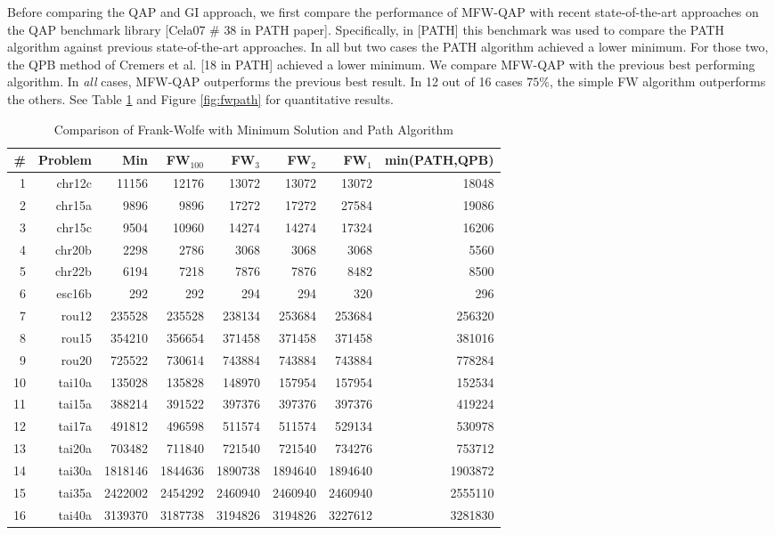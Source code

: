 Before comparing the QAP and GI approach, we first compare the performance of MFW-QAP with recent state-of-the-art approaches on the QAP benchmark library [Cela07 \# 38 in PATH paper].  Specifically, in [PATH] this benchmark was used to compare the PATH algorithm against previous state-of-the-art approaches.  In all but two cases the PATH algorithm achieved a lower minimum.  For those two, the QPB method of Cremers et al. [18 in PATH] achieved a lower minimum.  We compare MFW-QAP with the previous best performing algorithm.  In \emph{all} cases, MFW-QAP outperforms the previous best result.  In 12 out of 16 cases $75\%$, the simple FW algorithm outperforms the others.  See Table \ref{tab:fwpath} and Figure \ref{fig:fwpath} for quantitative results.


\begin{table}[h!]
\caption{Comparison of Frank-Wolfe with Minimum Solution and Path Algorithm}
\begin{center}
\begin{tabular}{|r|r|r||r|r|r|r|r|}
\hline
\# & Problem  &   Min    & FW$_{100}$&FW$_{3}$&FW$_{2}$&FW$_{1}$& min(PATH,QPB)\\
\hline
1&    chr12c &   11156 &   12176 &   13072 &   13072 &   13072 &   18048\\
2&    chr15a &    9896 &    9896 &   17272 &   17272 &   27584 &   19086\\
3&    chr15c &    9504 &   10960 &   14274 &   14274 &   17324 &   16206\\
4&   chr20b &    2298 &    2786 &    3068 &    3068 &    3068 &    5560\\
5&    chr22b &    6194 &    7218 &    7876 &    7876 &    8482 &    8500\\
6&    esc16b &     292 &     292 &     294 &     294 &     320 &     296\\
7&     rou12 &  235528 &  235528 &  238134 &  253684 &  253684 &  256320\\
8&     rou15 &  354210 &  356654 &  371458 &  371458 &  371458 &  381016\\
9&     rou20 &  725522 &  730614 &  743884 &  743884 &  743884 &  778284\\
10&    tai10a &  135028 &  135828 &  148970 &  157954 &  157954 &  152534\\
11&    tai15a &  388214 &  391522 &  397376 &  397376 &  397376 &  419224\\
12&    tai17a &  491812 &  496598 &  511574 &  511574 &  529134 &  530978\\
13&    tai20a &  703482 &  711840 &  721540 &  721540 &  734276 &  753712\\
14&    tai30a & 1818146 & 1844636 & 1890738 & 1894640 & 1894640 & 1903872\\
15&    tai35a & 2422002 & 2454292 & 2460940 & 2460940 & 2460940 & 2555110\\
16&    tai40a & 3139370 & 3187738 & 3194826 & 3194826 & 3227612 & 3281830\\
    \hline
\end{tabular}
\end{center}
\label{tab:fwpath}
\end{table}%

